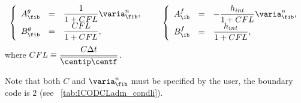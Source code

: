 \begin{equation}
\begin{array}{r c l}
\left\lbrace
\begin{array}{r c l}
A^g_\fib & = & \dfrac{1}{1+ CFL} \varia^n_\fib ,\\
B^g_\fib & = & \dfrac{CFL}{1+ CFL},
\end{array}
\right.
& &
\left\lbrace
\begin{array}{r c l}
A^f_\ib & = &  -  \dfrac{h_{int}}{1+ CFL} \varia^n_\fib,\\
B^f_\ib & = &  \dfrac{h_{int}}{1+ CFL},
\end{array}
\right.
\end{array}
\end{equation}
where $CFL \equiv \dfrac{C \Delta t}{\overline{\centip \centf} }$.

\begin{remark}
Note that both $C$ and $\varia^n_\fib$ must be specified by the user, the boundary code is $2$ (see \tablename~\ref{tab:ICODCLadm_condli}).
\end{remark}

